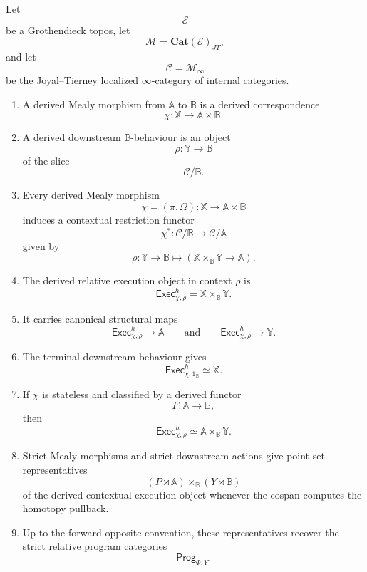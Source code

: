 \begin{theorem}
\label{thm:derived-contextual-mealy-proarrow-logic}
Let
\[
\mathcal E
\]
be a Grothendieck topos, let
\[
\mathcal M=\mathbf{Cat}(\mathcal E)_{JT},
\]
and let
\[
\mathcal C=\mathcal M_\infty
\]
be the Joyal--Tierney localized \(\infty\)-category of internal categories.

\begin{enumerate}
\item A derived Mealy morphism from \(\mathbb A\) to \(\mathbb B\) is a
derived correspondence
\[
\chi:\mathbb X\to\mathbb A\times\mathbb B.
\]

\item A derived downstream \(\mathbb B\)-behaviour is an object
\[
\rho:\mathbb Y\to\mathbb B
\]
of the slice
\[
\mathcal C/\mathbb B.
\]

\item Every derived Mealy morphism
\[
\chi=(\pi,\Omega):\mathbb X\to\mathbb A\times\mathbb B
\]
induces a contextual restriction functor
\[
\chi^\ast:\mathcal C/\mathbb B\to\mathcal C/\mathbb A
\]
given by
\[
\rho:\mathbb Y\to\mathbb B
\longmapsto
\left(
\mathbb X\times_{\mathbb B}\mathbb Y\to\mathbb A
\right).
\]

\item The derived relative execution object in context \(\rho\) is
\[
\mathsf{Exec}^h_{\chi,\rho}
=
\mathbb X\times_{\mathbb B}\mathbb Y.
\]

\item It carries canonical structural maps
\[
\mathsf{Exec}^h_{\chi,\rho}\to\mathbb A
\qquad
\text{and}
\qquad
\mathsf{Exec}^h_{\chi,\rho}\to\mathbb Y.
\]

\item The terminal downstream behaviour gives
\[
\mathsf{Exec}^h_{\chi,1_{\mathbb B}}
\simeq
\mathbb X.
\]

\item If \(\chi\) is stateless and classified by a derived functor
\[
F:\mathbb A\to\mathbb B,
\]
then
\[
\mathsf{Exec}^h_{\chi,\rho}
\simeq
\mathbb A\times_{\mathbb B}\mathbb Y.
\]

\item Strict Mealy morphisms and strict downstream actions give point-set
representatives
\[
(P\rtimes\mathbb A)\times_{\mathbb B}(Y\rtimes\mathbb B)
\]
of the derived contextual execution object whenever the cospan computes the
homotopy pullback.

\item Up to the forward-opposite convention, these representatives recover the
strict relative program categories
\[
\mathsf{Prog}_{\Phi,Y}.
\]


\end{enumerate}
\end{theorem}
